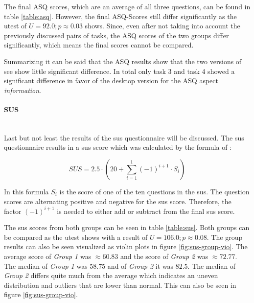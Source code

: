  The final ASQ scores, which are an average of all three questions, can be found in table \ref{table:asq}.
 However, the final ASQ-Scores still differ significantly as the \gls{utest} of $U=92.0; p \approx 0.03$ shows.
 Since, even after not taking into account the previously discussed pairs of tasks, the \gls{ASQ} scores of the two groups differ significantly, which means the final scores cannot be compared.

\begin{table}[htb]
  \caption{The \gls{ASQ}-scores from all 18 subjects. The first row contains the \gls{ASQ}-scores for the desktop application and the second row for the mobile application. The figures have been rounded to whole numbers.}
  \label{table:asq}
\end{table}

Summarizing it can be said that the \gls{ASQ} results show that the two versions of \gls{see} show little significant difference. 
In total only task 3 and task 4 showed a significant difference in favor of the desktop version for the \gls{ASQ} aspect \textit{information}.
\paragraph{SUS}\mbox{}\\
Last but not least the results of the \gls{sus} questionnaire will be discussed.
The \gls{sus} questionnaire results in a \gls{sus} score which was calculated by the formula of \cite{lewis2018system}:

\begin{equation}
SUS = 2.5 \cdot (20 + \sum_{i=1}^1 (-1)^{i+1} \cdot S_i)
\end{equation}

In this formula $S_i$ is the score of one of the ten questions in the \gls{sus}. 
The question scores are alternating positive and negative for the \gls{sus} score.
Therefore, the factor $(-1)^{i+1}$ is needed to either add or subtract from the final \gls{sus} score.

The \gls{sus} scores from both groups can be seen in table \ref{table:sus}.
Both groups can be compared as the \gls{utest} shows with a result of $U=106.0; p \approx 0.08$. 
The group results can also be seen visualized as violin plots in figure \ref{fig:sus-group-vio}.
The average score of \textit{Group 1} was $ \approx 60.83$ and the score of \textit{Group 2} was $\approx 72.77$.
The median of \textit{Group 1} was 58.75 and of \textit{Group 2} it was 82.5.
The median of \textit{Group 2} differs quite much from the average which indicates an uneven distribution and outliers that are lower than normal.
This can also be seen in figure \ref{fig:sus-group-vio}.

